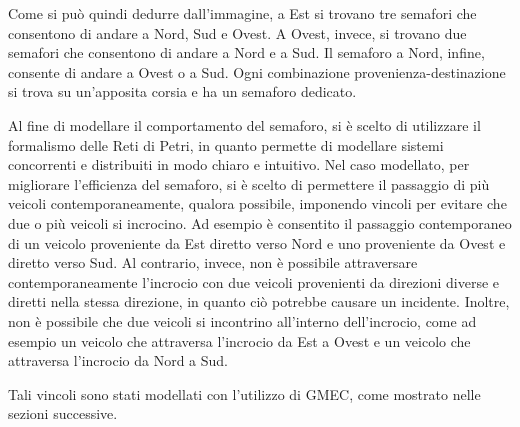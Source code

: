 Come si può quindi dedurre dall'immagine, a Est si trovano tre semafori 
che consentono di andare a Nord, Sud e Ovest. A Ovest, invece, si trovano 
due semafori che consentono di andare a Nord e a Sud. Il semaforo a Nord, 
infine, consente di andare a Ovest o a Sud. Ogni combinazione provenienza-destinazione 
si trova su un'apposita corsia e ha un semaforo dedicato.

Al fine di modellare il comportamento del semaforo, si è scelto di utilizzare 
il formalismo delle Reti di Petri, in quanto permette di modellare sistemi 
concorrenti e distribuiti in modo chiaro e intuitivo. Nel caso modellato, 
per migliorare l'efficienza del semaforo, si è scelto di permettere il 
passaggio di più veicoli contemporaneamente, qualora possibile, imponendo 
vincoli per evitare che due o più veicoli si incrocino. Ad esempio è consentito 
il passaggio contemporaneo di un veicolo proveniente da Est diretto verso Nord 
e uno proveniente da Ovest e diretto verso Sud. Al contrario, invece, non è possibile 
attraversare contemporaneamente l'incrocio con due veicoli provenienti da direzioni diverse 
e diretti nella stessa direzione, in quanto ciò potrebbe causare un incidente. Inoltre, 
non è possibile che due veicoli si incontrino all'interno dell'incrocio, come ad esempio 
un veicolo che attraversa l'incrocio da Est a Ovest e un veicolo che attraversa l'incrocio da Nord a Sud.

Tali vincoli sono stati modellati con l'utilizzo di GMEC, come mostrato nelle sezioni successive.